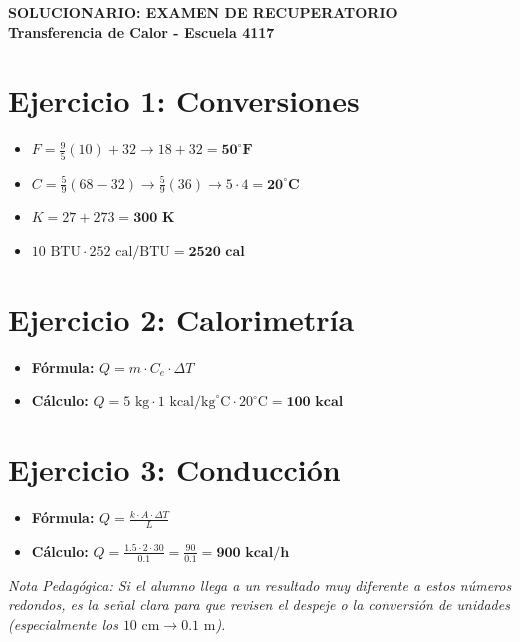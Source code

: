 \documentclass[12pt]{article}
\begin{document}
\begin{center}
    \textbf{SOLUCIONARIO: EXAMEN DE RECUPERATORIO}
    \\\textbf{Transferencia de Calor - Escuela 4117}
\end{center}

\section*{Ejercicio 1: Conversiones}

\begin{itemize}
    \item[a)] $F = \frac{9}{5}(10) + 32 \rightarrow 18 + 32 = \mathbf{50^\circ F}$
    \item[b)] $C = \frac{5}{9}(68 - 32) \rightarrow \frac{5}{9}(36) \rightarrow 5 \cdot 4 = \mathbf{20^\circ C}$
    \item[c)] $K = 27 + 273 = \mathbf{300\text{ K}}$
    \item[d)] $10\text{ BTU} \cdot 252\text{ cal/BTU} = \mathbf{2520\text{ cal}}$
\end{itemize}

\section*{Ejercicio 2: Calorimetría}

\begin{itemize}
    \item \textbf{Fórmula:} $Q = m \cdot C_e \cdot \Delta T$
    \item \textbf{Cálculo:} $Q = 5\text{ kg} \cdot 1\text{ kcal/kg}^\circ\text{C} \cdot 20^\circ\text{C} = \mathbf{100\text{ kcal}}$
\end{itemize}

\section*{Ejercicio 3: Conducción}

\begin{itemize}
    \item \textbf{Fórmula:} $Q = \frac{k \cdot A \cdot \Delta T}{L}$
    \item \textbf{Cálculo:} $Q = \frac{1.5 \cdot 2 \cdot 30}{0.1} = \frac{90}{0.1} = \mathbf{900\text{ kcal/h}}$
\end{itemize}

\vspace{1cm}
\noindent \textit{Nota Pedagógica: Si el alumno llega a un resultado muy diferente a estos números redondos, es la señal clara para que revisen el despeje o la conversión de unidades (especialmente los $10\text{ cm} \rightarrow 0.1\text{ m}$).}
\end{document}
